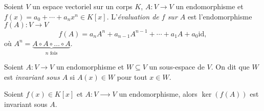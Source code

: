 











\begin{definition}
  \label{def:34}
  Soient $V$ un espace vectoriel sur un corps $K$, $A: V \rightarrow V$ un endomorphisme et $f(x) = a_0+ \cdots + a_n x^n\in K[x]$. L'\emph{évaluation de $f$ sur $A$} est l'endomorphisme $f(A): V \rightarrow V$ 
  \begin{displaymath}
    f(A) = a_n A^n + a_{n-1}A^{n-1}+ \cdots + a_1 A + a_0 \mathrm{id},
  \end{displaymath}
  où $A^n = \underbrace{A \circ A \circ \dots \circ A}_{n \text{ fois}}$.
\end{definition}



\begin{definition}
  \label{def:35}
  Soient $A:V \rightarrow V$ un endomorphisme et $W \subseteq V$ un sous-espace de $V$. On dit que $W$ est \emph{invariant sous $A$} si $A(x) \in W$ pour tout $x \in W$. 
\end{definition}



\begin{lemma}
  \label{lem:20}
  Soient $f(x) ∈ K[x]$ et $A:V ⟶  V$ un endomorphisme,  alors $\ker(f(A))$ est invariant sous $A$. 
\end{lemma}


